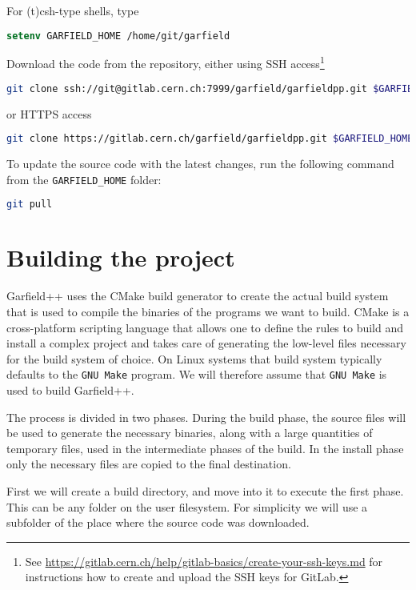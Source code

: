 For (t)csh-type shells, type
\begin{lstlisting}[language=csh]
setenv GARFIELD_HOME /home/git/garfield
\end{lstlisting}

Download the code from the repository, either 
using SSH access\footnote{See \url{https://gitlab.cern.ch/help/gitlab-basics/create-your-ssh-keys.md}
for instructions how to create and upload the SSH keys for GitLab.} 
\begin{lstlisting}[language=bash]
git clone ssh://git@gitlab.cern.ch:7999/garfield/garfieldpp.git $GARFIELD_HOME
\end{lstlisting}
or HTTPS access
\begin{lstlisting}[language=bash]
git clone https://gitlab.cern.ch/garfield/garfieldpp.git $GARFIELD_HOME
\end{lstlisting}

To update the source code with the latest changes, 
run the following command from the \texttt{GARFIELD\_HOME} folder:
\begin{lstlisting}[language=bash]
git pull
\end{lstlisting}

\section{Building the project}

Garfield++ uses the CMake build generator to create the actual build system 
that is used to compile the binaries of the programs we want to build. 
CMake is a cross-platform scripting language that allows one to define 
the rules to build and install a complex project and takes care of 
generating the low-level files necessary for the build system of choice. 
On Linux systems that build system typically defaults to the 
\texttt{GNU Make} program. 
We will therefore assume that \texttt{GNU Make} is used to build Garfield++.

The process is divided in two phases. 
During the build phase, the source files will be used to generate the 
necessary binaries, along with a large quantities of temporary files, 
used in the intermediate phases of the build. 
In the install phase only the necessary files are copied to the final 
destination.

First we will create a build directory, and move into it to execute the first phase. 
This can be any folder on the user filesystem. 
For simplicity we will use a subfolder of the place where the source code was downloaded.

